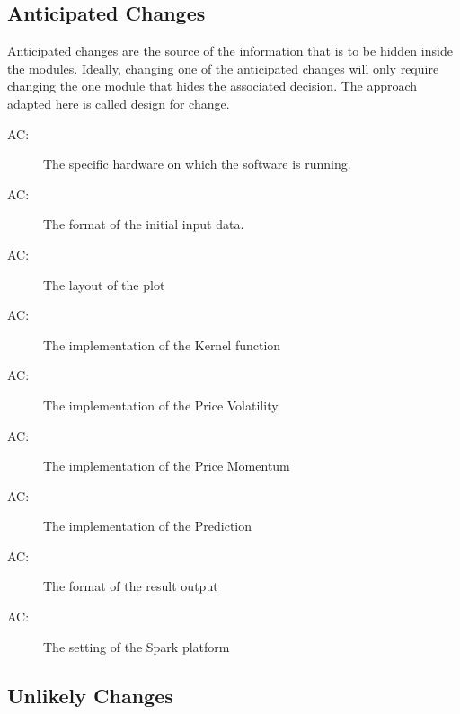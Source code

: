 \documentclass[12pt, titlepage]{article}
\newcounter{acnum}
\newcommand{\actheacnum}{AC\theacnum}
\begin{document}
\subsection{Anticipated Changes} \label{SecAchange}

Anticipated changes are the source of the information that is to be hidden
inside the modules. Ideally, changing one of the anticipated changes will only
require changing the one module that hides the associated decision. The approach
adapted here is called design for
change.

\begin{description}
\item[ \actheacnum \label{AC1}:] The specific
hardware on which the software is running.
\item[ \actheacnum \label{AC2}:] The format of the
initial input data.
\item[ \actheacnum \label{AC3}:] The layout of the plot
\item[ \actheacnum \label{AC4}:] The implementation of the Kernel function
\item[ \actheacnum \label{AC5}:] The implementation of the Price Volatility
\item[ \actheacnum \label{AC6}:] The implementation of the Price Momentum
\item[ \actheacnum \label{AC7}:] The implementation of the Prediction
\item[ \actheacnum \label{AC8}:] The format of the result output 
\item[ \actheacnum \label{AC9}:] The setting of the Spark platform
\end{description}


\subsection{Unlikely Changes} \label{SecUchange}
\end{document}
